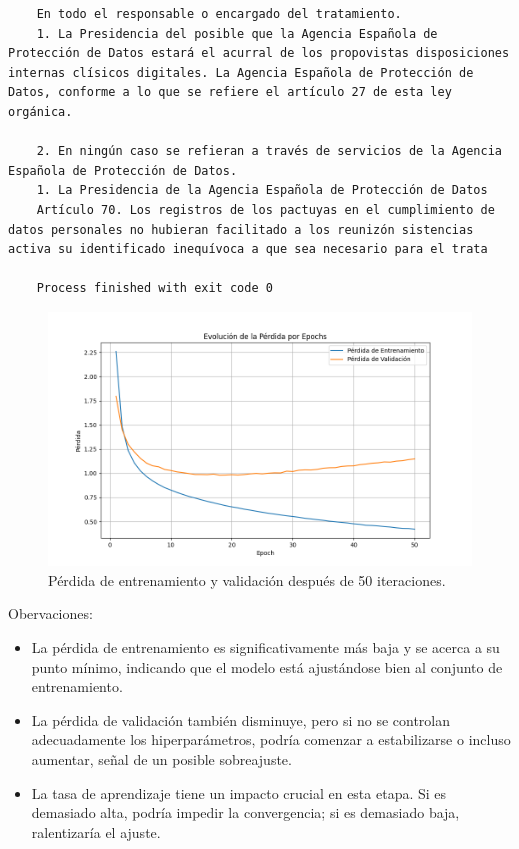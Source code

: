 \documentclass{article}
\begin{document}
{\begin{verbatim}
    En todo el responsable o encargado del tratamiento.
    1. La Presidencia del posible que la Agencia Española de Protección de Datos estará el acurral de los propovistas disposiciones internas clísicos digitales. La Agencia Española de Protección de Datos, conforme a lo que se refiere el artículo 27 de esta ley orgánica.
    
    2. En ningún caso se refieran a través de servicios de la Agencia Española de Protección de Datos.
    1. La Presidencia de la Agencia Española de Protección de Datos
    Artículo 70. Los registros de los pactuyas en el cumplimiento de datos personales no hubieran facilitado a los reunizón sistencias activa su identificado inequívoca a que sea necesario para el trata
    
    Process finished with exit code 0
\end{verbatim}
}

\newpage

\begin{figure}[H]
    \centering
    \includegraphics[scale=0.4]{50.png}
    \caption{Pérdida de entrenamiento y validación después de 50 iteraciones.}
\end{figure}

{\large{Obervaciones}}:
\begin{itemize}
    \item La pérdida de entrenamiento es significativamente más baja y se acerca a su punto mínimo, indicando que el modelo está ajustándose bien al conjunto de entrenamiento.
    \item La pérdida de validación también disminuye, pero si no se controlan adecuadamente los hiperparámetros, podría comenzar a estabilizarse o incluso aumentar, señal de un posible sobreajuste.
    \item La tasa de aprendizaje tiene un impacto crucial en esta etapa. Si es demasiado alta, podría impedir la convergencia; si es demasiado baja, ralentizaría el ajuste.
\end{itemize}
\end{document}
